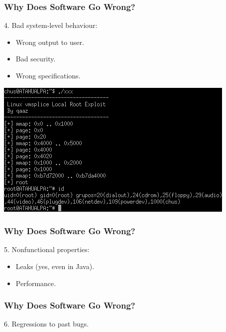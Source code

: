 \documentclass{beamer}
\newenvironment{changemargin}[1]{%
  \begin{list}{}{%
    \setlength{\topsep}{0pt}%
    \setlength{\leftmargin}{#1}%
    \setlength{\rightmargin}{1em}
    \setlength{\listparindent}{\parindent}%
    \setlength{\itemindent}{\parindent}%
    \setlength{\parsep}{\parskip}%
  }%
  \item[]}{\end{list}}
\begin{document}
\begin{frame}

  \frametitle{Why Does Software Go Wrong?}

  \begin{changemargin}{2em}
  4. Bad system-level behaviour:
\begin{itemize}
  \item Wrong output to user.
  \item Bad security.
  \item Wrong specifications.
\end{itemize}
  \end{changemargin}
\begin{center}
\includegraphics[height=.4\textheight]{L01/fot3.png}
\end{center}

\end{frame}

\begin{frame}
  \frametitle{Why Does Software Go Wrong?}

  \Large
  \begin{changemargin}{2em}
  5. Nonfunctional properties:
\begin{itemize}
  \item Leaks (yes, even in Java).
  \item Performance.
\end{itemize}
  \end{changemargin}

\end{frame}

\begin{frame}

  \frametitle{Why Does Software Go Wrong?}
  \begin{changemargin}{2em}

\Large
 6. Regressions to past bugs.
  \end{changemargin}
\end{frame}
\end{document}
